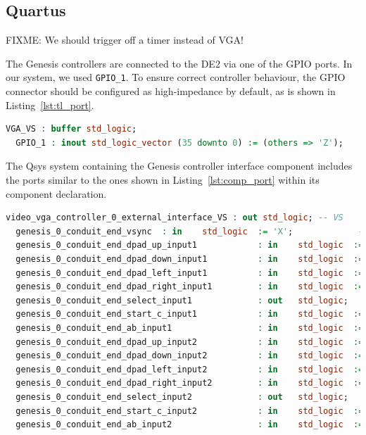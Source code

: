 \documentclass{capstonedoc}
\begin{document}
\subsection{Quartus}

FIXME: We should trigger off a timer instead of VGA!

The Genesis controllers are connected to the DE2 via one of the GPIO ports. In
our system, we used \texttt{GPIO\_1}. To ensure correct controller behaviour,
the GPIO connector should be configured as high-impedance by default, as is
shown in Listing~\ref{lst:tl_port}.

\begin{lstlisting}[language={vhdl},caption={Entity Port for Genesis Controllers},label={lst:tl_port}]
  VGA_VS : buffer std_logic;
  GPIO_1 : inout std_logic_vector (35 downto 0) := (others => 'Z');
\end{lstlisting}

The Qsys system containing the Genesis controller interface component includes
the ports similar to the ones shown in Listing~\ref{lst:comp_port} within its
component declaration.

\begin{lstlisting}[language={vhdl},caption={Qsys System Ports for Genesis Controller},label={lst:comp_port}]
  video_vga_controller_0_external_interface_VS : out std_logic; -- VS
  genesis_0_conduit_end_vsync  : in    std_logic  := 'X';             -- vsync
  genesis_0_conduit_end_dpad_up_input1            : in    std_logic  := 'X';             -- dpad_up_input1
  genesis_0_conduit_end_dpad_down_input1          : in    std_logic  := 'X';             -- dpad_down_input1
  genesis_0_conduit_end_dpad_left_input1          : in    std_logic  := 'X';             -- dpad_left_input1
  genesis_0_conduit_end_dpad_right_input1         : in    std_logic  := 'X';             -- dpad_right_input1
  genesis_0_conduit_end_select_input1             : out   std_logic;                     -- select_input1
  genesis_0_conduit_end_start_c_input1            : in    std_logic  := 'X';             -- start_c_input1
  genesis_0_conduit_end_ab_input1                 : in    std_logic  := 'X';             -- ab_input1
  genesis_0_conduit_end_dpad_up_input2            : in    std_logic  := 'X';             -- dpad_up_input2
  genesis_0_conduit_end_dpad_down_input2          : in    std_logic  := 'X';             -- dpad_down_input2
  genesis_0_conduit_end_dpad_left_input2          : in    std_logic  := 'X';             -- dpad_left_input2
  genesis_0_conduit_end_dpad_right_input2         : in    std_logic  := 'X';             -- dpad_right_input2
  genesis_0_conduit_end_select_input2             : out   std_logic;                     -- select_input2
  genesis_0_conduit_end_start_c_input2            : in    std_logic  := 'X';             -- start_c_input2
  genesis_0_conduit_end_ab_input2                 : in    std_logic  := 'X';             -- ab_input2
\end{lstlisting}
\end{document}
